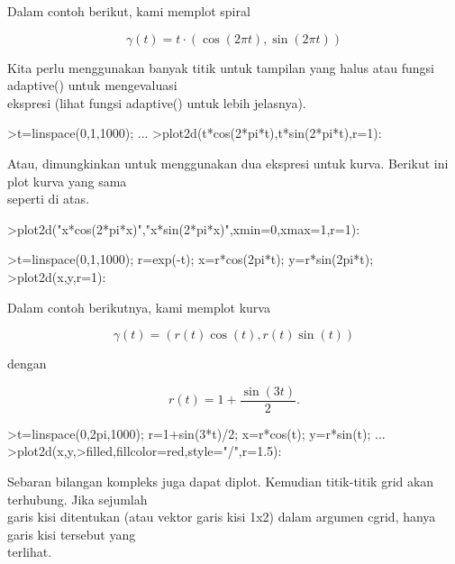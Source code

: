 \documentclass[a4paper,10pt]{article}
\begin{document}
\begin{eulernotebook}
\begin{eulercomment}
\begin{eulercomment}
\begin{eulercomment}
\begin{eulercomment}
\begin{eulercomment}
\begin{eulercomment}
\begin{eulercomment}
Dalam contoh berikut, kami memplot spiral

\end{eulercomment}
\begin{eulerformula}
\[
\gamma(t) = t \cdot (\cos(2\pi t),\sin(2\pi t))
\]
\end{eulerformula}
\begin{eulercomment}
Kita perlu menggunakan banyak titik untuk tampilan yang halus atau
fungsi adaptive() untuk mengevaluasi\\
ekspresi (lihat fungsi adaptive() untuk lebih jelasnya).
\end{eulercomment}
\begin{eulerprompt}
>t=linspace(0,1,1000); ...
>plot2d(t*cos(2*pi*t),t*sin(2*pi*t),r=1):
\end{eulerprompt}
\begin{eulercomment}
Atau, dimungkinkan untuk menggunakan dua ekspresi untuk kurva. Berikut
ini plot kurva yang sama\\
seperti di atas.
\end{eulercomment}
\begin{eulerprompt}
>plot2d("x*cos(2*pi*x)","x*sin(2*pi*x)",xmin=0,xmax=1,r=1):
\end{eulerprompt}
\begin{eulerprompt}
>t=linspace(0,1,1000); r=exp(-t); x=r*cos(2pi*t); y=r*sin(2pi*t);
>plot2d(x,y,r=1):
\end{eulerprompt}
\begin{eulercomment}
Dalam contoh berikutnya, kami memplot kurva\\
\end{eulercomment}
\begin{eulerformula}
\[
\gamma(t) = (r(t) \cos(t), r(t) \sin(t))
\]
\end{eulerformula}
\begin{eulercomment}
dengan

\end{eulercomment}
\begin{eulerformula}
\[
r(t) = 1 + \dfrac{\sin(3t)}{2}.
\]
\end{eulerformula}
\begin{eulerprompt}
>t=linspace(0,2pi,1000); r=1+sin(3*t)/2; x=r*cos(t); y=r*sin(t); ...
>plot2d(x,y,>filled,fillcolor=red,style="/",r=1.5):
\end{eulerprompt}
\begin{eulercomment}
Sebaran bilangan kompleks juga dapat diplot. Kemudian titik-titik grid
akan terhubung. Jika sejumlah\\
garis kisi ditentukan (atau vektor garis kisi 1x2) dalam argumen
cgrid, hanya garis kisi tersebut yang\\
terlihat.


\end{eulercomment}
\end{eulercomment}
\end{eulercomment}
\end{eulercomment}
\end{eulercomment}
\end{eulercomment}
\end{eulercomment}
\end{eulernotebook}
\end{document}
